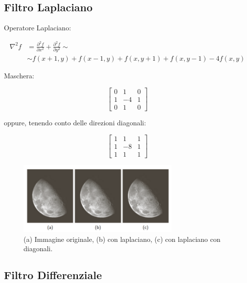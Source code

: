 \subsection{Filtro Laplaciano}

Operatore Laplaciano:

\begin{align*}
    \nabla^2 f & = \frac{\partial^2{f}}{\partial{x^2}} + \frac{\partial^2{f}}{\partial{y^2}} \sim \\
               & \sim f(x+1,y)+f(x-1,y)+f(x,y+1)+f(x,y-1)-4f(x,y)
\end{align*}

Maschera:

\begin{center}
    \[
        \begin{bmatrix}
            0 & 1  & 0 \\
            1 & -4 & 1 \\
            0 & 1  & 0
        \end{bmatrix}
    \]
\end{center}

oppure, tenendo conto delle direzioni diagonali:

\begin{center}
    \[
        \begin{bmatrix}
            1 & 1  & 1 \\
            1 & -8 & 1 \\
            1 & 1  & 1
        \end{bmatrix}
    \]
\end{center}

\begin{figure}[H]
    \centering
    \includegraphics[width=8cm, keepaspectratio]{capitoli/immagini/imgs/laplaciano.png}
    \caption{(a) Immagine originale, (b) con laplaciano, (c) con laplaciano con diagonali.}
\end{figure}

\subsection{Filtro Differenziale}

